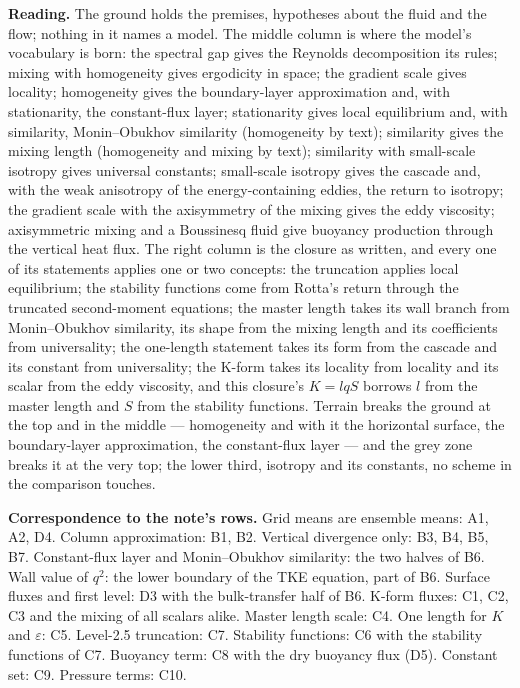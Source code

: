 \documentclass[10pt]{article}
\newcommand{\qsq}{q^{2}}
\begin{document}
\vspace{0.1ex}
{\footnotesize\textbf{Reading.} The ground holds the premises, hypotheses about the fluid and the flow; nothing in it names a model. The middle column is where
the model's vocabulary is born: the spectral gap gives the Reynolds decomposition its rules; mixing with homogeneity gives ergodicity in space; the gradient scale gives locality; homogeneity gives the
boundary-layer approximation and, with stationarity, the constant-flux layer; stationarity gives local equilibrium and, with similarity, Monin--Obukhov similarity (homogeneity by text); similarity gives the mixing length (homogeneity and mixing by text); similarity with small-scale isotropy gives universal constants; small-scale isotropy gives the cascade and, with the weak anisotropy of the energy-containing eddies, the return to isotropy; the gradient scale with the axisymmetry of the mixing gives the eddy viscosity; axisymmetric mixing and a Boussinesq fluid give buoyancy production through the vertical heat flux. The right
column is the closure as written, and every one of its statements applies one or two concepts: the truncation
applies local equilibrium; the stability functions come from Rotta's return through the truncated second-moment equations; the master length takes its wall branch from Monin--Obukhov similarity, its shape from the mixing length and its coefficients from universality;
the one-length statement takes its form from the cascade and its constant from universality; the K-form takes its locality from locality and its scalar from the eddy viscosity, and this closure's $K = lqS$ borrows $l$ from the master length and $S$ from the stability functions. Terrain breaks the ground at the top
and in the middle --- homogeneity and with it the horizontal surface, the boundary-layer approximation, the constant-flux layer --- and the grey zone breaks it
at the very top; the lower third, isotropy and its constants, no scheme in the comparison touches.\par}

\vspace{0.1ex}
{\footnotesize\textbf{Correspondence to the note's rows.} Grid means are ensemble means: A1, A2, D4. Column approximation: B1, B2. Vertical divergence only: B3, B4, B5, B7. Constant-flux layer and Monin--Obukhov similarity: the two halves of B6. Wall value of $\qsq$: the lower boundary of the TKE equation, part of B6. Surface fluxes and first level: D3 with the bulk-transfer half of B6. K-form fluxes: C1, C2, C3 and the mixing of all scalars alike. Master length scale: C4. One length for $K$ and $\varepsilon$: C5. Level-2.5 truncation: C7. Stability functions: C6 with the stability functions of C7. Buoyancy term: C8 with the dry buoyancy flux (D5). Constant set: C9. Pressure terms: C10.\par}
\end{document}
